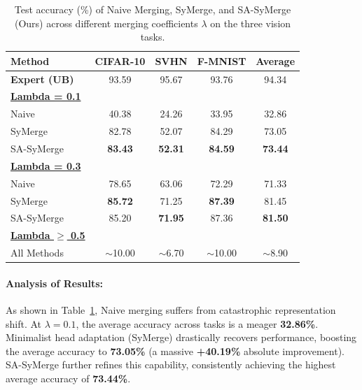 \documentclass{article}
\theoremstyle{plain}
\theoremstyle{definition}
\theoremstyle{remark}
\begin{document}
\begin{table}[t]
\caption{Test accuracy (\%) of Naive Merging, SyMerge, and SA-SyMerge (Ours) across different merging coefficients $\lambda$ on the three vision tasks.}
\label{tab:main_results}
\begin{center}
\begin{small}
\begin{sc}
\setlength{\tabcolsep}{3.5pt}
\begin{tabular}{lcccc}
\toprule
Method & CIFAR-10 & SVHN & F-MNIST & Average \\
\midrule
\textbf{Expert (UB)} & 93.59 & 95.67 & 93.76 & 94.34 \\
\midrule
\underline{\textbf{Lambda = 0.1}} &&&& \\
Naive & 40.38 & 24.26 & 33.95 & 32.86 \\
SyMerge & 82.78 & 52.07 & 84.29 & 73.05 \\
SA-SyMerge & \textbf{83.43} & \textbf{52.31} & \textbf{84.59} & \textbf{73.44} \\
\midrule
\underline{\textbf{Lambda = 0.3}} &&&& \\
Naive & 78.65 & 63.06 & 72.29 & 71.33 \\
SyMerge & \textbf{85.72} & 71.25 & \textbf{87.39} & 81.45 \\
SA-SyMerge & 85.20 & \textbf{71.95} & 87.36 & \textbf{81.50} \\
\midrule
\underline{\textbf{Lambda $\ge$ 0.5}} &&&& \\
All Methods & $\sim$10.00 & $\sim$6.70 & $\sim$10.00 & $\sim$8.90 \\
\bottomrule
\end{tabular}
\end{sc}
\end{small}
\end{center}
\vskip -0.1in
\end{table}

\paragraph{Analysis of Results:}
As shown in Table~\ref{tab:main_results}, Naive merging suffers from catastrophic representation shift. At $\lambda=0.1$, the average accuracy across tasks is a meager \textbf{32.86\%}. Minimalist head adaptation (SyMerge) drastically recovers performance, boosting the average accuracy to \textbf{73.05\%} (a massive \textbf{+40.19\%} absolute improvement). SA-SyMerge further refines this capability, consistently achieving the highest average accuracy of \textbf{73.44\%}.
\end{document}
